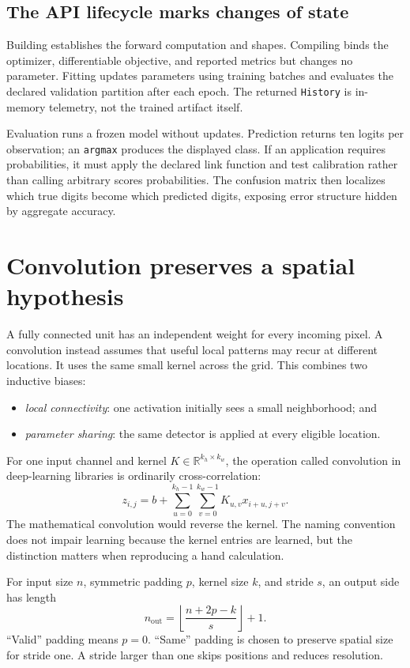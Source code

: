 \subsection{The API lifecycle marks changes of state}

Building establishes the forward computation and shapes. Compiling binds the
optimizer, differentiable objective, and reported metrics but changes no
parameter. Fitting updates parameters using training batches and evaluates the
declared validation partition after each epoch. The returned
\texttt{History} is in-memory telemetry, not the trained artifact itself.

Evaluation runs a frozen model without updates. Prediction returns ten logits
per observation; an \texttt{argmax} produces the displayed class. If an
application requires probabilities, it must apply the declared link function
and test calibration rather than calling arbitrary scores probabilities. The
confusion matrix then localizes which true digits become which predicted
digits, exposing error structure hidden by aggregate accuracy.

\section{Convolution preserves a spatial hypothesis}

A fully connected unit has an independent weight for every incoming pixel. A
convolution instead assumes that useful local patterns may recur at different
locations. It uses the same small kernel across the grid. This combines two
inductive biases:

\begin{itemize}
  \item \emph{local connectivity}: one activation initially sees a small
  neighborhood; and
  \item \emph{parameter sharing}: the same detector is applied at every
  eligible location.
\end{itemize}

For one input channel and kernel $K\in\mathbb{R}^{k_h\times k_w}$, the
operation called convolution in deep-learning libraries is ordinarily
cross-correlation:
\[
  z_{i,j}=b+
  \sum_{u=0}^{k_h-1}\sum_{v=0}^{k_w-1}
  K_{u,v}x_{i+u,j+v}.
\]
The mathematical convolution would reverse the kernel. The naming convention
does not impair learning because the kernel entries are learned, but the
distinction matters when reproducing a hand calculation.

For input size $n$, symmetric padding $p$, kernel size $k$, and stride $s$, an
output side has length
\[
  n_{\mathrm{out}}
  =\left\lfloor\frac{n+2p-k}{s}\right\rfloor+1.
\]
``Valid'' padding means $p=0$. ``Same'' padding is chosen to preserve spatial
size for stride one. A stride larger than one skips positions and reduces
resolution.

